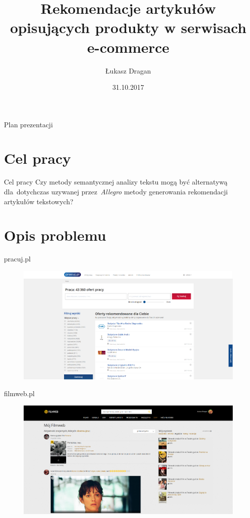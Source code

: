 \documentclass{beamer}
\title[Praca magisterska]{Rekomendacje artykułów opisujących produkty w serwisach e-commerce}
\author{Łukasz Dragan}
\institute{Informatyka spec. Metody sztucznej inteligencji, MiNI PW}
\date{31.10.2017}
\begin{document}
	
	\begin{frame}
		\titlepage
	\end{frame}
	
	\begin{frame}{Plan prezentacji}
	  \tableofcontents
	\end{frame}
	
	\section{Cel pracy}
		\begin{frame}{Cel pracy}
			Czy metody semantycznej analizy tekstu mogą być alternatywą dla~dotychczas uzywanej przez~\emph{Allegro} metody generowania rekomendacji artykułów tekstowych?
		\end{frame}
	\section{Opis problemu}
	
	\begin{frame}{pracuj.pl}
		\begin{figure}
			\centering
			\includegraphics[width=1\textwidth]{img/pracuj.png}
		\end{figure}
	\end{frame}
	
	\begin{frame}{filmweb.pl}
		\begin{figure}
			\centering
			\includegraphics[width=1\textwidth]{img/filmweb.png}
		\end{figure}
	\end{frame}
	
\end{document}

